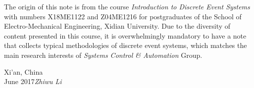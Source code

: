 %
%

\preface





The origin of this note is from the course \textit{Introduction to Discrete Event Systems} with numbers X18ME1122 and Z04ME1216 for postgraduates of the School of Electro-Mechanical Engineering, Xidian University. Due to the diversity of content presented in this course, it is overwhelmingly mandatory to have a note that collects typical methodologies of discrete event systems, which matches the main research interests of \textit{Systems Control \& Automation} Group.


\vspace{\baselineskip}
\begin{flushright}\noindent
Xi'an, China\hfill\\ %
June 2017\hfill {\it Zhiwu Li}\\
\end{flushright}


